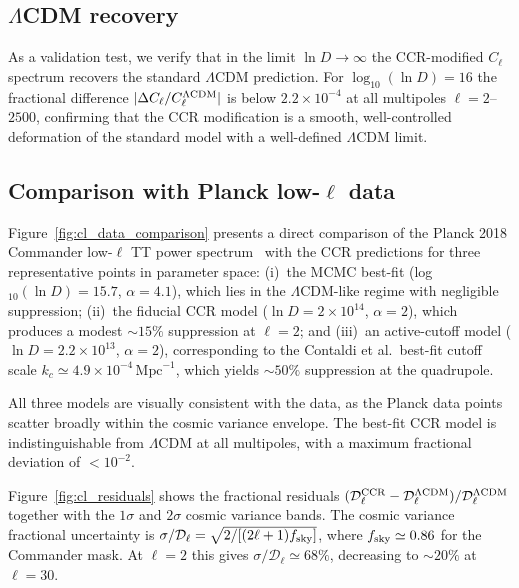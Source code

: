 \subsection{\texorpdfstring{$\Lambda$CDM}{ΛCDM} recovery}
\label{subsec:lcdm_recovery}

As a validation test, we verify that in the limit $\ln D \to \infty$
the CCR-modified $C_\ell$ spectrum recovers the standard $\Lambda$CDM
prediction. For $\log_{10}(\ln D) = 16$ the fractional difference
$|\Delta C_\ell / C_\ell^{\Lambda{\rm CDM}}|$ is below
$2.2 \times 10^{-4}$ at all multipoles $\ell = 2$--$2500$, confirming
that the CCR modification is a smooth, well-controlled deformation
of the standard model with a well-defined $\Lambda$CDM limit.


\subsection{Comparison with Planck low-\texorpdfstring{$\ell$}{ℓ} data}
\label{subsec:cl_comparison}

Figure~\ref{fig:cl_data_comparison} presents a direct comparison of the
Planck 2018 Commander low-$\ell$ TT power spectrum~\cite{Planck:2018likelihood}
with the CCR predictions for three representative points in parameter space:
(i)~the MCMC best-fit (log$_{10}(\ln D) = 15.7$, $\alpha = 4.1$), which lies
in the $\Lambda$CDM-like regime with negligible suppression;
(ii)~the fiducial CCR model ($\ln D = 2\times 10^{14}$, $\alpha = 2$),
which produces a modest $\sim 15\%$ suppression at $\ell = 2$; and
(iii)~an active-cutoff model ($\ln D = 2.2\times 10^{13}$, $\alpha = 2$),
corresponding to the Contaldi et al.\ best-fit cutoff scale
$k_c \simeq 4.9\times 10^{-4}\,\mathrm{Mpc}^{-1}$, which yields
$\sim 50\%$ suppression at the quadrupole.

All three models are visually consistent with the data, as the Planck
data points scatter broadly within the cosmic variance envelope. The
best-fit CCR model is indistinguishable from $\Lambda$CDM at all
multipoles, with a maximum fractional deviation of $< 10^{-2}$.

Figure~\ref{fig:cl_residuals} shows the fractional residuals
$(\mathcal{D}_\ell^{\rm CCR} - \mathcal{D}_\ell^{\Lambda\rm CDM}) /
\mathcal{D}_\ell^{\Lambda\rm CDM}$ together with the $1\sigma$ and
$2\sigma$ cosmic variance bands. The cosmic variance fractional
uncertainty is $\sigma / \mathcal{D}_\ell = \sqrt{2/[(2\ell+1)f_{\rm sky}]}$,
where $f_{\rm sky} \simeq 0.86$ for the Commander mask. At $\ell = 2$ this
gives $\sigma / \mathcal{D}_\ell \simeq 68\%$, decreasing to $\sim 20\%$
at $\ell = 30$.

